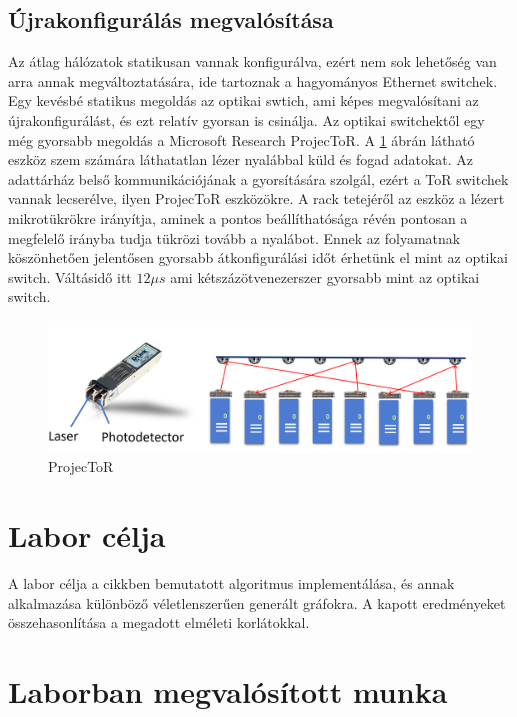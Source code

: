 \documentclass[12pt]{report}
\begin{document}
\subsection{Újrakonfigurálás megvalósítása}

Az átlag hálózatok statikusan vannak konfigurálva, ezért nem sok lehetőség van arra annak megváltoztatására, ide tartoznak a hagyományos Ethernet switchek.
Egy kevésbé statikus megoldás az optikai swtich, ami képes megvalósítani az újrakonfigurálást, és ezt relatív gyorsan is csinálja.
Az optikai switchektől egy még gyorsabb megoldás a Microsoft Research ProjecToR. 
A \ref{projector-fig} ábrán látható eszköz szem számára láthatatlan lézer nyalábbal küld és fogad adatokat.
Az adattárház belső kommunikációjának a gyorsítására szolgál, ezért a ToR switchek vannak lecserélve, ilyen ProjecToR eszközökre.
A rack tetejéről az eszköz a lézert mikrotükrökre irányítja, aminek a pontos beállíthatósága révén pontosan a megfelelő irányba tudja tükrözi tovább a nyalábot.
Ennek az folyamatnak köszönhetően jelentősen gyorsabb átkonfigurálási időt érhetünk el mint az optikai switch.
Váltásidő itt $12\mu s$ ami kétszázötvenezerszer gyorsabb mint az optikai switch.
	
\begin{figure}[h]
	\centering
	\includegraphics[width=0.9\linewidth]{pictures/laserswitch.png}
	\caption{ProjecToR}
	\label{projector-fig}
\end{figure}

\section{Labor célja}

A labor célja a cikkben\cite{avin_demand-aware_nodate} bemutatott algoritmus implementálása, és annak alkalmazása különböző véletlenszerűen generált gráfokra. 
A kapott eredményeket összehasonlítása a megadott elméleti korlátokkal.

\section{Laborban megvalósított munka}
\end{document}
